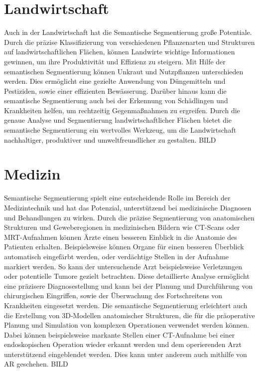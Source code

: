\section{Landwirtschaft}

Auch in der Landwirtschaft hat die Semantische Segmentierung große Potentiale.
Durch die präzise Klassifizierung von verschiedenen Pflanzenarten und
Strukturen auf landwirtschaftlichen Flächen, können Landwirte wichtige
Informationen gewinnen, um ihre Produktivität und Effizienz zu steigern. Mit
Hilfe der semantischen Segmentierung können Unkraut und Nutzpflanzen
unterschieden werden. Dies ermöglicht eine gezielte Anwendung von Düngemitteln
und Pestiziden, sowie einer effizienten Bewässerung. Darüber hinaus kann die
semantische Segmentierung auch bei der Erkennung von Schädlingen und
Krankheiten helfen, um rechtzeitig Gegenmaßnahmen zu ergreifen. Durch die
genaue Analyse und Segmentierung landwirtschaftlicher Flächen bietet die
semantische Segmentierung ein wertvolles Werkzeug, um die Landwirtschaft
nachhaltiger, produktiver und umweltfreundlicher zu gestalten. BILD

\section{Medizin}
Semantische Segmentierung spielt eine entscheidende Rolle im Bereich der
Medizintechnik und hat das Potenzial, unterstützend bei medizinische Diagnosen
und Behandlungen zu wirken. Durch die präzise Segmentierung von anatomischen
Strukturen und Geweberegionen in medizinischen Bildern wie CT-Scans oder
MRT-Aufnahmen können Ärzte einen besseren Einblick in die Anatomie des
Patienten erhalten. Beispielsweise können Organe für einen besseren Überblick
automatisch eingefärbt werden, oder verdächtige Stellen in der Aufnahme markiert
werden. So kann der untersuchende Arzt beispielsweise Verletzungen oder
potentielle Tumore gezielt betrachten. Diese detaillierte Analyse ermöglicht
eine präzisere Diagnosestellung und kann bei der Planung und Durchführung von
chirurgischen Eingriffen, sowie der Überwachung des Fortschreitens von
Krankheiten eingesetzt werden. Die semantische Segmentierung erleichtert auch
die Erstellung von 3D-Modellen anatomischer Strukturen, die für die
präoperative Planung und Simulation von komplexen Operationen verwendet werden
können. Dabei können beispielsweise markante Stellen einer CT-Aufnahme bei
einer endoskopischen Operation wieder erkannt werden und dem operierenden Arzt
unterstützend eingeblendet werden. Dies kann unter anderem auch mithilfe von AR
geschehen. BILD